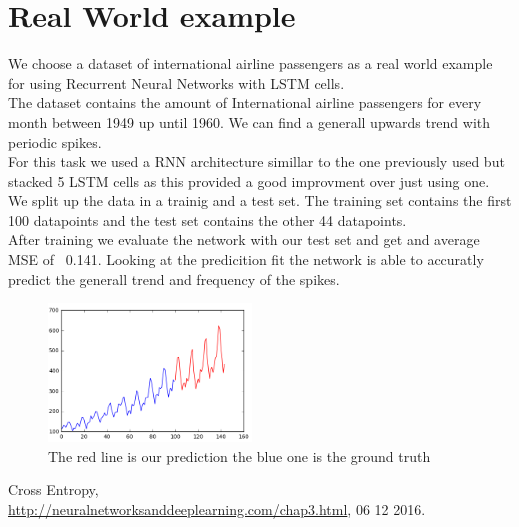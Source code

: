 \documentclass[twoside, twocolumn]{article}
\begin{document}
\section{Real World example}

We choose a dataset of international airline passengers as a real world example for using Recurrent Neural Networks with LSTM cells. \\
The dataset contains the amount of International airline passengers for every month between 1949 up until 1960. We can find a generall upwards trend with periodic spikes. \\
For this task we used a RNN architecture simillar to the one previously used but stacked 5 LSTM cells as this provided a good improvment over just using one. \\
We split up the data in a trainig and a test set. The training set contains the first 100 datapoints and the test set contains the other 44 datapoints. \\
After training we evaluate the network with our test set and get and average MSE of ~0.141. Looking at the predicition fit the network is able to accuratly predict the generall trend and frequency of the spikes.

\begin{figure}[htb]
\centering
	\includegraphics[width=0.48\textwidth]{rnn_plane_fit.png}
	\caption{The red line is our prediction the blue one is the ground truth}
\end{figure}


\begin{thebibliography}{99} %

Cross Entropy,\\ \url{http://neuralnetworksanddeeplearning.com/chap3.html}, 06 12 2016.
 
\end{thebibliography}

\end{document}
